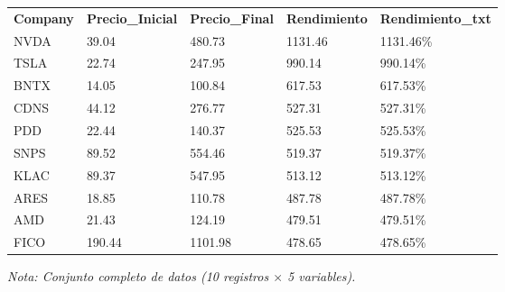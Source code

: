 

\begin{table}[htbp]

\centering

\begin{adjustbox}{max width=\textwidth}

\begin{tabular}{lllll}

\rowcolor{ThemeBackground}
\rule{0pt}{0.45cm}
\textcolor{ThemeGold}{\bfseries Company} & \textcolor{ThemeGold}{\bfseries Precio\_Inicial} & \textcolor{ThemeGold}{\bfseries Precio\_Final} & \textcolor{ThemeGold}{\bfseries Rendimiento} & \textcolor{ThemeGold}{\bfseries Rendimiento\_txt} \\

NVDA & 39.04 & 480.73 & 1131.46 & 1131.46\% \\
TSLA & 22.74 & 247.95 & 990.14 & 990.14\% \\
BNTX & 14.05 & 100.84 & 617.53 & 617.53\% \\
CDNS & 44.12 & 276.77 & 527.31 & 527.31\% \\
PDD & 22.44 & 140.37 & 525.53 & 525.53\% \\
SNPS & 89.52 & 554.46 & 519.37 & 519.37\% \\
KLAC & 89.37 & 547.95 & 513.12 & 513.12\% \\
ARES & 18.85 & 110.78 & 487.78 & 487.78\% \\
AMD & 21.43 & 124.19 & 479.51 & 479.51\% \\
FICO & 190.44 & 1101.98 & 478.65 & 478.65\% \\
\bottomrule
\end{tabular}

\end{adjustbox}

\vspace{0.15cm}
{\raggedright\sffamily\footnotesize\color{ThemeMuted}
\textit{Nota: Conjunto completo de datos (10 registros $\times$ 5 variables).}}

\end{table}
